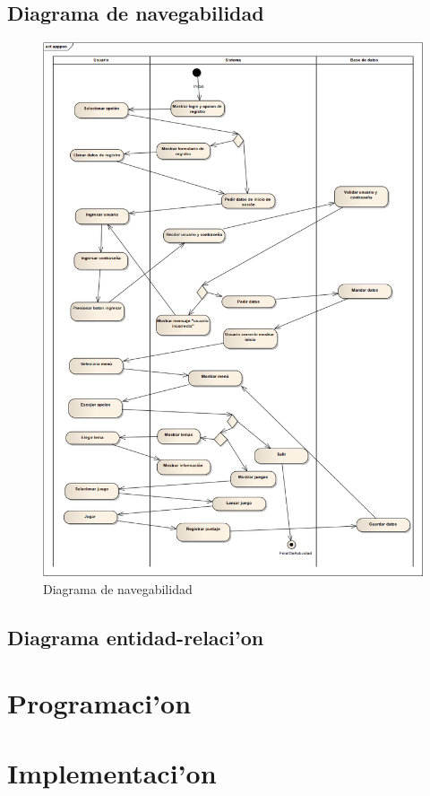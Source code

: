 \subsection{Diagrama de navegabilidad}
\begin{figure}[H]
\includegraphics[scale=0.2]{img/diagrama.png} 
\caption{Diagrama de navegabilidad}
\end{figure}

\subsection{Diagrama entidad-relaci'on}

\section{Programaci'on}

\section{Implementaci'on}

